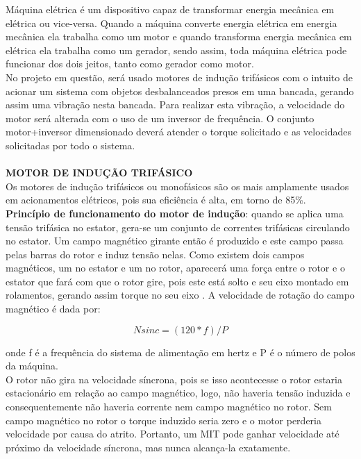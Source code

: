 \label{desenvolvimento_eletromecanica}

Máquina elétrica é um dispositivo capaz de transformar energia mecânica em elétrica ou vice-versa. Quando a máquina converte energia elétrica em energia mecânica ela trabalha como um motor e quando transforma energia mecânica em elétrica ela trabalha como um gerador, sendo assim, toda máquina elétrica pode funcionar dos dois jeitos, tanto como gerador como motor. \cite{chapman}  \\

No projeto em questão, será usado motores de indução trifásicos com o intuito de acionar um sistema com objetos desbalanceados presos em uma bancada, gerando assim uma vibração nesta bancada. Para realizar esta vibração, a velocidade do motor será alterada com o uso de um inversor de frequência. O conjunto motor+inversor dimensionado deverá atender o torque solicitado e as velocidades solicitadas por todo o sistema.\\
\\
\textbf{MOTOR DE INDUÇÃO TRIFÁSICO}\\

Os motores de indução trifásicos ou monofásicos são os mais amplamente usados em acionamentos elétricos, pois sua eficiência é alta, em torno de 85\%.\cite{WEG}
\\

\textbf{Princípio de funcionamento do motor de indução}: quando se aplica uma tensão trifásica no estator, gera-se um conjunto de correntes trifásicas circulando no estator. Um campo magnético girante então é produzido e este campo passa pelas barras do rotor e induz tensão nelas. Como existem dois campos magnéticos, um no estator e um no rotor, aparecerá uma força entre o rotor e o estator que fará com que o rotor gire, pois este está solto e seu eixo montado em rolamentos, gerando assim torque no seu eixo \cite{chapman}. A velocidade de rotação do campo magnético é dada por:


    \begin{equation}\label{Rotação de Campo Mag.}
            Nsinc=(120*f)/P
    \end{equation}

onde f é a frequência do sistema de alimentação em hertz e P é o número de polos da máquina. \cite{chapman}
\\

O rotor não gira na velocidade síncrona, pois se isso acontecesse o rotor estaria estacionário em relação ao campo magnético, logo, não haveria tensão induzida e consequentemente não haveria corrente nem campo magnético no rotor. Sem campo magnético no rotor o torque induzido seria zero e o motor perderia velocidade por causa do atrito. Portanto, um MIT pode ganhar velocidade até próximo da velocidade síncrona, mas nunca alcança-la exatamente.\cite{chapman}
\\

